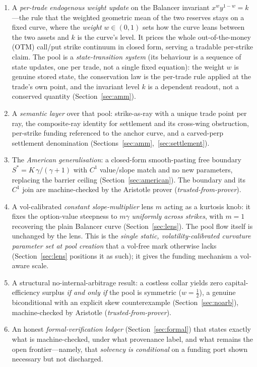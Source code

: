 \documentclass[runningheads]{llncs}
\newcommand{\tfp}{\emph{trusted-from-prover}}
\begin{document}
\begin{enumerate}[leftmargin=2em]
  \item A \emph{per-trade endogenous weight update} on the Balancer invariant
        $x^{w}y^{1-w}=k$---the rule that the weighted geometric mean of the two
        reserves stays on a fixed curve, where the \emph{weight} $w\in(0,1)$ sets
        how the curve leans between the two assets and $k$ is the curve's level.
        It prices the whole out-of-the-money (OTM) call/put strike continuum in
        closed form, serving a tradable per-strike claim. The pool is a
        \emph{state-transition system} (its behaviour is a sequence of state
        updates, one per trade, not a single fixed equation): the weight $w$ is
        genuine stored state, the conservation law is the per-trade rule applied at
        the trade's own point, and the invariant level $k$ is a dependent readout,
        not a conserved quantity (Section~\ref{sec:amm}).
  \item A \emph{semantic layer} over that pool: strike-as-ray with a unique
        trade point per ray, the composite-ray identity for settlement and its
        cross-wing obstruction, per-strike funding referenced to the anchor
        curve, and a carved-perp settlement denomination
        (Sections~\ref{sec:amm},~\ref{sec:settlement}).
  \item The \emph{American generalisation}: a closed-form smooth-pasting free
        boundary $S^{\ast}=K\,\gamma/(\gamma+1)$ with $C^{1}$ value/slope match
        and no new parameters, replacing the barrier ceiling
        (Section~\ref{sec:american}). The boundary and its $C^{1}$ join are
        machine-checked by the Aristotle prover (\tfp{}).
  \item A vol-calibrated \emph{constant slope-multiplier} lens $m$ acting as a
        kurtosis knob: it fixes the option-value steepness to $m\gamma$
        \emph{uniformly across strikes}, with $m=1$ recovering the plain
        Balancer curve (Section~\ref{sec:lens}). The pool flow itself is
        unchanged by the lens. This is the \emph{single static,
        volatility-calibrated curvature parameter set at pool creation} that a
        vol-free mark otherwise lacks (Section~\ref{sec:lens} positions it as
        such); it gives the funding mechanism a vol-aware scale.
  \item A structural no-internal-arbitrage result: a costless collar yields zero
        capital-efficiency surplus \emph{if and only if} the pool is symmetric
        ($w=\tfrac12$), a genuine biconditional with an explicit skew
        counterexample (Section~\ref{sec:noarb}), machine-checked by Aristotle
        (\tfp{}).
  \item An honest \emph{formal-verification ledger} (Section~\ref{sec:formal})
        that states exactly what is machine-checked, under what provenance label,
        and what remains the open frontier---namely, that \emph{solvency is
        conditional} on a funding port shown necessary but not discharged.
\end{enumerate}
\end{document}
